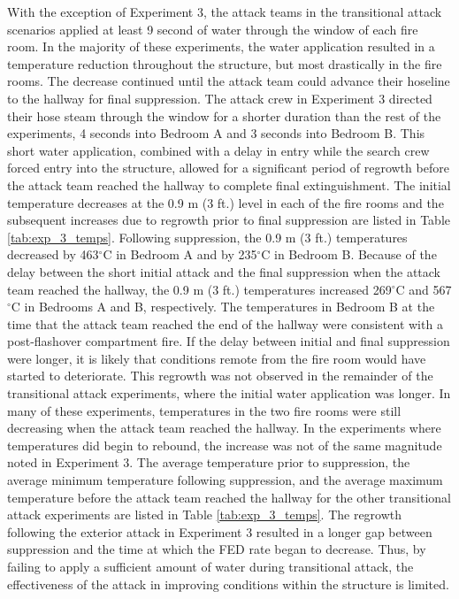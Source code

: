 \documentclass[12pt,oneside]{article}
\begin{document}
With the exception of Experiment 3, the attack teams in the transitional attack scenarios applied at least 9 second of water through the window of each fire room. In the majority of these experiments, the water application resulted in a temperature reduction throughout the structure, but most drastically in the fire rooms. The decrease continued until the attack team could advance their hoseline to the hallway for final suppression.  The attack crew in Experiment 3 directed their hose steam through the window for a shorter duration than the rest of the experiments, 4 seconds into Bedroom A and 3 seconds into Bedroom B. This short water application, combined with a delay in entry while the search crew forced entry into the structure, allowed for a significant period of regrowth before the attack team reached the hallway to complete final extinguishment. The initial temperature decreases at the 0.9 m (3 ft.) level in each of the fire rooms and the subsequent increases due to regrowth prior to final suppression are listed in Table \ref{tab:exp_3_temps}. Following suppression, the 0.9 m (3 ft.) temperatures decreased by 463$^{\circ}$C in Bedroom A and by 235$^{\circ}$C in Bedroom B. Because of the delay between the short initial attack and the final suppression when the attack team reached the hallway, the 0.9 m (3 ft.) temperatures increased 269$^{\circ}$C and 567$^{\circ}$C in Bedrooms A and B, respectively. The temperatures in Bedroom B at the time that the attack team reached the end of the hallway were consistent with a post-flashover compartment fire. If the delay between initial and final suppression were longer, it is likely that conditions remote from the fire room would have started to deteriorate. This regrowth was not observed in the remainder of the transitional attack experiments, where the initial water application was longer. In many of these experiments, temperatures in the two fire rooms were still decreasing when the attack team reached the hallway. In the experiments where temperatures did begin to rebound, the increase was not of the same magnitude noted in Experiment 3. The average temperature prior to suppression, the average minimum temperature following suppression, and the average maximum temperature before the attack team reached the hallway for the other transitional attack experiments are listed in Table \ref{tab:exp_3_temps}. The regrowth following the exterior attack in Experiment 3 resulted in a longer gap between suppression and the time at which the FED rate began to decrease. Thus, by failing to apply a sufficient amount of water  during transitional attack, the effectiveness of the attack in improving conditions within the structure is limited. 
\end{document}
